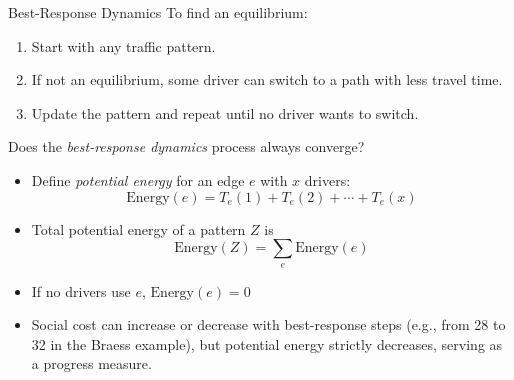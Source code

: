 \documentclass[10pt]{beamer}
\begin{document}
\begin{frame}{Best-Response Dynamics}
  \onslide<+->
  To find an equilibrium:
  \begin{enumerate}[<+->]
    \item Start with any traffic pattern.
    \item If not an equilibrium, some driver can switch to a path with less travel time.
    \item Update the pattern and repeat until no driver wants to switch.
  \end{enumerate}
  \onslide<+->
  Does the \emph{best-response dynamics} process always converge?
  \vspace{3mm}
  \begin{itemize}[<+->]
    \item Define \emph{potential energy} for an edge \( e \) with \( x \) drivers:
      \[\text{Energy}(e) = T_e(1) + T_e(2) + \cdots + T_e(x)\]
    \item Total potential energy of a pattern \( Z \) is
      \[\text{Energy}(Z) = \sum_{e} \text{Energy}(e)\]
    \item If no drivers use \( e \), \( \text{Energy}(e) = 0 \)
    \item Social cost can increase or decrease with best-response steps (e.g., from 28 to 32 in the Braess example), but potential energy strictly decreases, serving as a progress measure.
  \end{itemize}
\end{frame}
\end{document}

